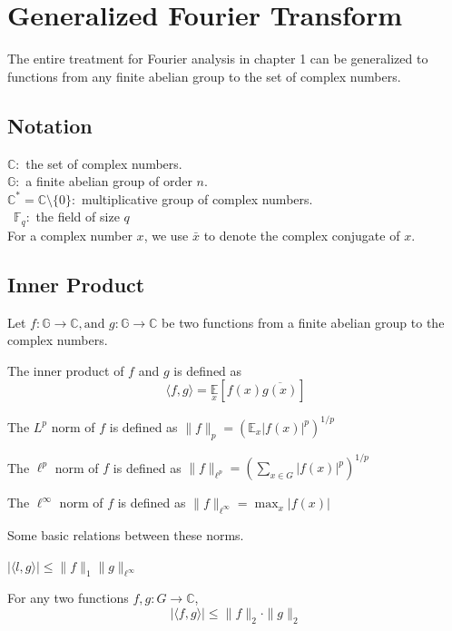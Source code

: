 \chapter{Generalized Fourier Transform}
The entire treatment for Fourier analysis in chapter 1 can be generalized to functions from any finite abelian group to the set of complex numbers.

\section{Notation}
$\mathbb{C}:$ the set of complex numbers. \\
$\mathbb{G}:$ a finite abelian group of order $n$.\\
$\mathbb{C}^* = \mathbb{C} \setminus \{0\}:$ multiplicative group of complex numbers. \\\
$\mathbb{F}_q:$ the field of size $q$ \\
For a complex number $x$, we use $\bar{x}$ to denote the complex conjugate of $x$.

\section{Inner Product}
Let $f : \mathbb{G} \rightarrow \mathbb{C}, \text{and } g : \mathbb{G} \rightarrow \mathbb{C}$ be two functions from a finite abelian group to the complex numbers. 
\begin{definition}
The inner product of $f$ and $g$ is defined as 
$$\langle f, g \rangle = \underset {x} {\mathbb{E}} [f(x) \overline{g(x)}] $$
\end{definition}

\begin{definition}
The $L^p$ norm of $f$ is defined as $\| f \|_{p} = ({\mathbb{E}_x} |f(x)|^p)^{1/p} $
\end{definition}

\begin{definition}
The $\ell^p$ norm of $f$ is defined as $\| f \|_{\ell ^p} = (\sum\limits_{x \in G} |f(x)|^p)^{1/p} $
\end{definition}

\begin{definition}
The $\ell^\infty$ norm of $f$ is defined as $\| f \|_{\ell ^\infty} = \max_x |f(x)| $
\end{definition}

\noindent Some basic relations between these norms. 

\begin{prop}
$| \langle l,g \rangle | \leq \|f\|_1 \| g \|_{\ell^\infty}$
\end{prop}
\begin{prop}
For any two functions $f, g : G \rightarrow \mathbb{C}$,
$$| \langle f, g \rangle | \leq \|f \|_2 \cdot \| g \|_2$$
\end{prop}

